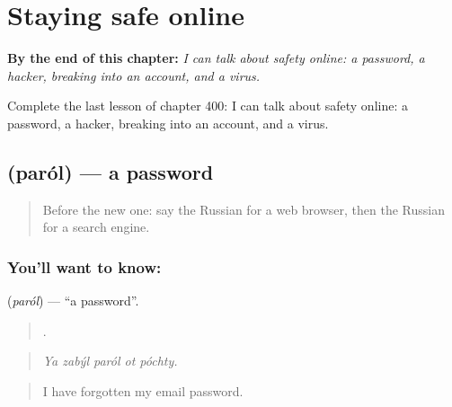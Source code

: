 
\chapter{Staying safe online}
\label{ch:ru-staying-safe-online}

\begin{chapteropening}
\textbf{By the end of this chapter:} \emph{I can talk about safety online: a password, a hacker, breaking into an account, and a virus.}

Complete the last lesson of chapter 400: I can talk about safety online: a password, a hacker, breaking into an account, and a virus.
\end{chapteropening}

\section[\texorpdfstring{\ru{пароль} (paról)}{пароль (paról)}]{ (paról) — a password}

\label{lesson:RU-C400-parol}



\begin{quote}
Before the new one: say the Russian for a web browser, then the Russian for a search engine.
\end{quote}

\subsection*{You'll want to know: }
\textbf{} (\emph{paról}) — \textquotedblleft{}a password\textquotedblright{}.

\begin{quote}
    .
\end{quote}

\begin{quote}
\emph{Ya zabýl paról ot póchty.}
\end{quote}

\begin{quote}
I have forgotten my email password.
\end{quote}

